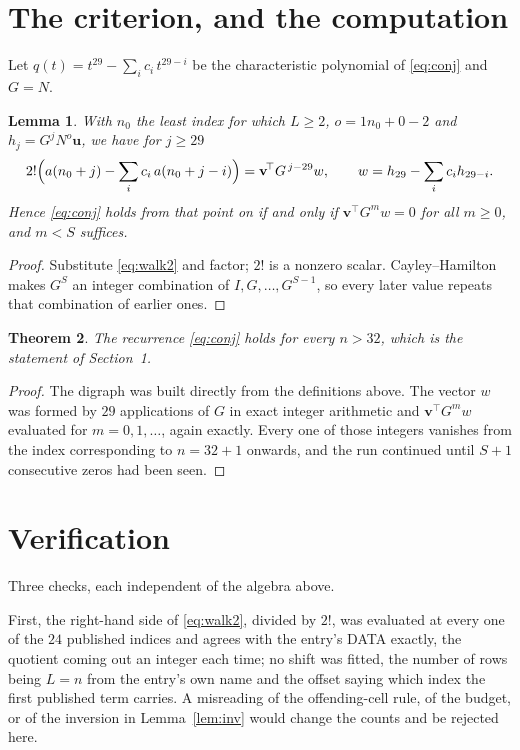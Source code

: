 \documentclass[11pt,a4paper]{article}
\theoremstyle{plain}
\newtheorem{theorem}{Theorem}
\newtheorem{lemma}[theorem]{Lemma}
\theoremstyle{definition}
\begin{document}
\section{The criterion, and the computation}

Let $q(t)=t^{29}-\sum_i c_i\,t^{29-i}$ be the characteristic polynomial of
\eqref{eq:conj} and $G=N$.

\begin{lemma}\label{lem:crit}
With $n_0$ the least index for which $L\ge2$, $o=1n_0+0-2$ and
$h_j=G^{j}N^{o}\mathbf{u}$, we have for $j\ge29$
\[
2!\Bigl(a(n_0+j)-\sum_i c_i\,a(n_0+j-i)\Bigr)=\mathbf{v}^{\!\top}G^{\,j-29}w,
\qquad w=h_{29}-\sum_i c_i h_{29-i} .
\]
Hence \eqref{eq:conj} holds from that point on if and only if
$\mathbf{v}^{\!\top}G^{m}w=0$ for all $m\ge0$, and $m<S$ suffices.
\end{lemma}

\begin{proof}
Substitute \eqref{eq:walk2} and factor; $2!$ is a nonzero scalar. Cayley--Hamilton
makes $G^{S}$ an integer combination of $I,G,\dots,G^{S-1}$, so every later value repeats
that combination of earlier ones.
\end{proof}

\begin{theorem}
The recurrence \eqref{eq:conj} holds for every $n>32$, which is the statement of
Section~1.
\end{theorem}

\begin{proof}
The digraph was built directly from the definitions above. The vector $w$ was formed by
$29$ applications of $G$ in exact integer arithmetic and $\mathbf{v}^{\!\top}G^{m}w$
evaluated for $m=0,1,\dots$, again exactly. Every one of those integers vanishes from the
index corresponding to $n=32+1$ onwards, and the run continued until $S+1$ consecutive
zeros had been seen.
\end{proof}

\section{Verification}

Three checks, each independent of the algebra above.

First, the right-hand side of \eqref{eq:walk2}, divided by $2!$, was evaluated at every
one of the $24$ published indices and agrees with the entry's DATA exactly, the quotient
coming out an integer each time; no shift was fitted, the number of rows being
$L=n$ from the entry's own name and the offset saying which index the first published
term carries. A misreading of the offending-cell rule, of the budget, or of the inversion in
Lemma~\ref{lem:inv} would change the counts and be rejected here.
\end{document}
